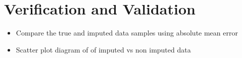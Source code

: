 \section{Verification and Validation}
\begin{itemize}
	\item Compare the true and imputed data samples using 	           absolute mean error
    \item Scatter plot diagram of of imputed vs non imputed
     data 
\end{itemize}









